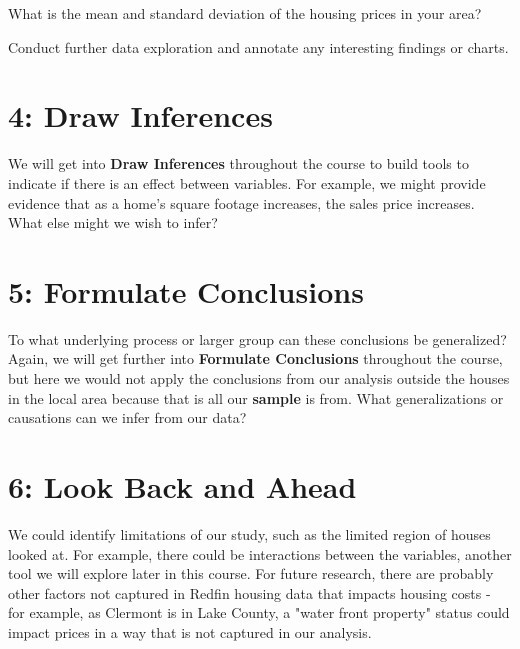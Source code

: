 \documentclass{article}
\begin{document}
\vspace{0.5 in}

What is the mean and standard deviation of the housing prices in your area?

\vspace{1.5 in}


Conduct further data exploration and annotate any interesting findings or charts.

\vfill

\newpage

\section*{4: Draw Inferences}

We will get into \textbf{Draw Inferences} throughout the course to build tools to indicate if there is an effect between variables. For example, we might provide evidence that as a home's square footage increases, the sales price increases. What else might we wish to infer?

\vspace{0.5 in}

\section*{5: Formulate Conclusions}

To what underlying process or larger group can these conclusions be generalized? Again, we will get further into \textbf{Formulate Conclusions} throughout the course, but here we would not apply the conclusions from our analysis outside the houses in the local area because that is all our \textbf{sample} is from. What generalizations or causations can we infer from our data?

\vspace{0.5 in}

\section*{6: Look Back and Ahead}

We could identify limitations of our study, such as the limited region of houses looked at. For example, there could be interactions between the variables, another tool we will explore later in this course.  For future research, there are probably other factors not captured in Redfin housing data that impacts housing costs - for example, as Clermont is in Lake County, a "water front property" status could impact prices in a way that is not captured in our analysis. 
\end{document}
